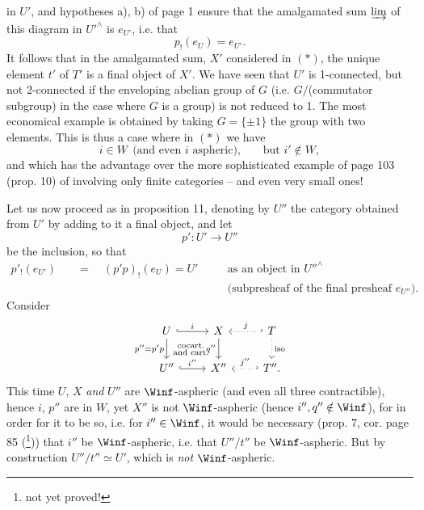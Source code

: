 
in $U'$, and hypotheses a), b) of page 1 ensure that the amalgamated sum $\varinjlim$ of this diagram in $U'^{\wedge}$ is $e_{U'}$, i.e. that
\[ p_!(e_U) = e_{U'}. \]
It follows that in the amalgamated sum, $X'$ considered in $(*)$, the unique element $t'$ of $T'$ is a final object of $X'$. We have seen that $U'$ is 1-connected, but not 2-connected if the enveloping abelian group of $G$ (i.e. $G/$(commutator subgroup) in the case where $G$ is a group) is not reduced to 1. The most economical example is obtained by taking $G = \{\pm 1\}$ the group with two elements. This is thus a case where in $(*)$ we have
\[ i \in W \ \ \text{(and even $i$ aspheric),} \qquad \text{but } i' \notin W, \]
and which has the advantage over the more sophisticated example of page 103 (prop. 10) of involving only finite categories -- and even very small ones!

Let us now proceed as in proposition 11, denoting by $U''$ the category obtained from $U'$ by adding to it a final
object, and let
\[ p' : U' \longrightarrow U'' \]
be the inclusion, so that
\[
\begin{aligned}
p'_!(e_{U'}) \quad &= \quad (p'p)_!(e_U) = U' \quad && \text{as an object in } U''^{\wedge}\\
& && \text{(subpresheaf of the final presheaf } e_{U''}\text{).}
\end{aligned}
\]
Consider
\[
\begin{tikzcd}
U \arrow[r, hook, "i"] \arrow[d, "{p''=p'p}"'] \arrow[dr, phantom, "\begin{smallmatrix}\text{cocart.}\\ \text{and cart.}\end{smallmatrix}"] & X \arrow[d, "q''"'] & T \arrow[l, hook', dotted, "j"'] \arrow[d, dotted, "\text{iso}"] \\
U'' \arrow[r, hook, "i''"] & X'' & T''. \arrow[l, hook', dotted, "j''"']
\end{tikzcd}
\]
This time $U$, $X$ \textit{and} $U''$ are $\Winf$-aspheric (and even all three contractible), hence $i$, $p''$ are in $W$, yet $X''$ is not $\Winf$-aspheric (hence $i'', q'' \notin \Winf$), for in order for it to be so, i.e. for $i'' \in \Winf$, it would be necessary (prop. 7, cor. page 85 (\footnote[4]{not yet proved!})) that $i''$ be $\Winf$-aspheric, i.e. that $U''/t''$ be $\Winf$-aspheric. But by construction $U''/t'' \simeq U'$, which is \textit{not} $\Winf$-aspheric.

